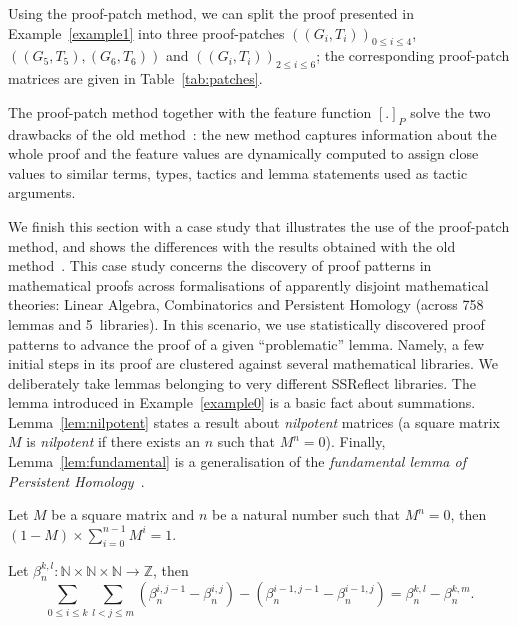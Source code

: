 \begin{example}
Using the proof-patch method, we  can split the proof presented in Example~\ref{example1} into three proof-patches $((G_i,T_i))_{0\leq i \leq 4}$, 
$((G_5,T_5),(G_6,T_6))$ and $((G_i,T_i))_{2\leq i \leq 6}$; the corresponding proof-patch matrices are given in Table~\ref{tab:patches}. 
\end{example}

The proof-patch method together with the feature function $[.]_P$ solve the two drawbacks of the old method~\cite{KHG13}: 
the new method captures information about the whole proof and the feature values are dynamically computed to assign close
values to similar terms, types, tactics and lemma statements used as tactic arguments. 


We finish this section with a case study that illustrates 
the use of the proof-patch method, and shows the differences with the results obtained with the old method~\cite{KHG13}. This case study concerns the discovery of proof patterns in mathematical proofs
across formalisations of apparently disjoint mathematical theories: Linear Algebra, Combinatorics and Persistent Homology  (across 758 lemmas and 5~libraries).
In this scenario, we use statistically discovered proof patterns to advance the proof of a given ``problematic'' lemma. 
Namely,  a few initial steps in its proof are clustered against several mathematical libraries. 
We deliberately take lemmas belonging to very different SSReflect libraries. The lemma introduced in Example~\ref{example0} is a basic fact about
summations. Lemma~\ref{lem:nilpotent} states a result about \emph{nilpotent} matrices %
(a square matrix $M$ is \emph{nilpotent}
if there exists an $n$ such that $M^n=0$). Finally, Lemma~\ref{lem:fundamental} is a generalisation of the \emph{fundamental lemma of 
Persistent Homology}~\cite{HCMS12}.


\begin{lemma}\label{lem:nilpotent}
 Let $M$ be a square matrix and $n$ be a natural number such that $M^n=0$, then $(1-M)\times \sum\limits_{i=0}^{n-1} M^i = 1$.
\end{lemma}


\begin{lemma}\label{lem:fundamental}
Let $\beta_n^{k,l}:\mathbb{N} \times \mathbb{N} \times \mathbb{N} \rightarrow \mathbb{Z}$, then
$$\sum_{0\leq i \leq k} \sum_{l<j\leq m} (\beta_n^{i,j-1} - \beta_n^{i,j}) - (\beta_n^{i-1,j-1} - \beta_n^{i-1,j}) = \beta_n^{k,l} - \beta_n^{k,m}.$$
\end{lemma}


